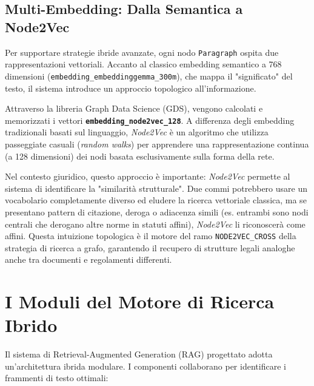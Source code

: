\subsection{Multi-Embedding: Dalla Semantica a Node2Vec}
Per supportare strategie ibride avanzate, ogni nodo \texttt{Paragraph} ospita due rappresentazioni vettoriali. Accanto al classico embedding semantico a 768 dimensioni (\texttt{embedding\_embeddinggemma\_300m}), che mappa il "significato" del testo, il sistema introduce un approccio topologico all'informazione.

Attraverso la libreria Graph Data Science (GDS), vengono calcolati e memorizzati i vettori \textbf{\texttt{embedding\_node2vec\_128}}. A differenza degli embedding tradizionali basati sul linguaggio, \textit{Node2Vec} è un algoritmo che utilizza passeggiate casuali (\textit{random walks}) per apprendere una rappresentazione continua (a 128 dimensioni) dei nodi basata esclusivamente sulla forma della rete. 

Nel contesto giuridico, questo approccio è importante: \textit{Node2Vec} permette al sistema di identificare la "similarità strutturale". Due commi potrebbero usare un vocabolario completamente diverso ed eludere la ricerca vettoriale classica, ma se presentano pattern di citazione, deroga o adiacenza simili (es. entrambi sono nodi centrali che derogano altre norme in statuti affini), \textit{Node2Vec} li riconoscerà come affini. Questa intuizione topologica è il motore del ramo \texttt{NODE2VEC\_CROSS} della strategia di ricerca a grafo, garantendo il recupero di strutture legali analoghe anche tra documenti e regolamenti differenti.

\section{I Moduli del Motore di Ricerca Ibrido}
Il sistema di Retrieval-Augmented Generation (RAG) progettato adotta un'architettura ibrida modulare. I componenti collaborano per identificare i frammenti di testo ottimali:

